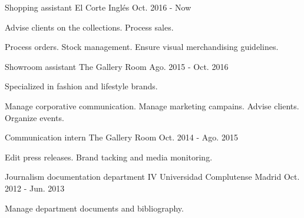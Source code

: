 

\begin{cventries}

  \cventry
    {Shopping assistant} %
    {El Corte Inglés} %
    {} %
    {Oct. 2016 - Now} %
    {
      \begin{cvitems} %
        \item {Advise clients on the collections. Process sales.}
        \item {Process orders. Stock management. Ensure visual merchandising guidelines.}
      \end{cvitems}
    }

  \cventry
    {Showroom assistant} %
    {The Gallery Room} %
    {} %
    {Ago. 2015 - Oct. 2016} %
    {
      \begin{cvitems} %
        \item {Specialized in fashion and lifestyle brands.}
        \item {Manage corporative communication. Manage marketing campains. Advise clients. Organize events.}
      \end{cvitems}
    }

  \cventry
    {Communication intern} %
    {The Gallery Room} %
    {} %
    {Oct. 2014 - Ago. 2015} %
    {
      \begin{cvitems} %
        \item {Edit press releases. Brand tacking and media monitoring.}
      \end{cvitems}
    }

  \cventry
    {Journalism documentation department IV} %
    {Universidad Complutense Madrid} %
    {} %
    {Oct. 2012 - Jun. 2013} %
    {
      \begin{cvitems} %
        \item {Manage department documents and bibliography.}
      \end{cvitems}
    }


\end{cventries}
